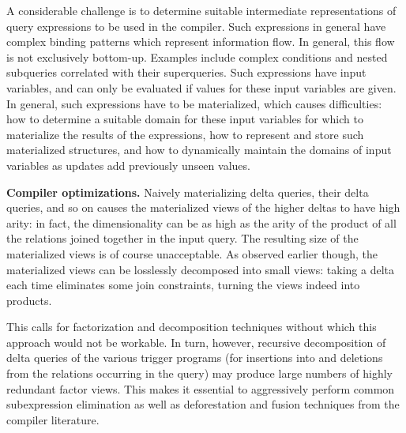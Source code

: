 A considerable challenge is to determine suitable intermediate representations of query expressions to be used in the compiler. Such expressions in general have complex binding patterns which represent information flow. In general, this flow is not exclusively bottom-up.
Examples include complex conditions and nested subqueries correlated with their superqueries. Such expressions have input variables, and can only be evaluated if values for these input variables are given. In general, such expressions have to be materialized, which causes difficulties: how to determine a suitable domain for these input variables for which to materialize the results of the expressions, how to represent and store such materialized structures, and how to dynamically maintain the domains of input variables as updates add previously unseen values.


{\bf Compiler optimizations.}
%
Naively materializing delta queries, their delta queries, and so on causes the materialized views of the higher deltas to have high arity: in fact, the dimensionality can be as high as the arity of the product of all the relations joined together in the input query. The resulting size of the materialized views is of course unacceptable. As observed earlier \cite{ahmad-vldb:09, koch-pods:10} though, the materialized views can be losslessly decomposed into small views: taking a delta each time eliminates some join constraints, turning the views indeed into products.

This calls for factorization and decomposition techniques without which this approach would not be workable. In turn, however, recursive decomposition of delta queries of the various trigger programs (for insertions into and deletions from the relations occurring in the query) may produce large numbers of highly redundant factor views. This makes it essential to aggressively perform common subexpression elimination as well as deforestation and fusion techniques from the compiler literature.


